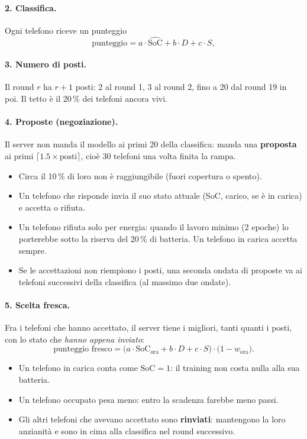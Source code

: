 \documentclass[11pt,a4paper]{article}
\begin{document}
\paragraph{2. Classifica.}
Ogni telefono riceve un punteggio
\begin{equation*}
  \text{punteggio} = a \cdot \widehat{\mathrm{SoC}} + b \cdot D + c \cdot S ,
\end{equation*}

\paragraph{3. Numero di posti.}
Il round $r$ ha $r + 1$ posti: 2 al round 1, 3 al round 2, fino a 20 dal
round 19 in poi. Il tetto è il 20\,\% dei telefoni ancora vivi.

\paragraph{4. Proposte (negoziazione).}
Il server non manda il modello ai primi 20 della classifica: manda una
\textbf{proposta} ai primi $\lceil 1.5 \times \text{posti} \rceil$, cioè
30 telefoni una volta finita la rampa.
\begin{itemize}
  \item Circa il 10\,\% di loro non è raggiungibile (fuori copertura o spento).
  \item Un telefono che risponde invia il suo stato attuale (SoC, carico, se
        è in carica) e accetta o rifiuta.
  \item Un telefono rifiuta solo per energia: quando il lavoro minimo (2 epoche)
        lo porterebbe sotto la riserva del 20\,\% di batteria. Un telefono in
        carica accetta sempre.
  \item Se le accettazioni non riempiono i posti, una seconda ondata di proposte
        va ai telefoni successivi della classifica (al massimo due ondate).
\end{itemize}

\paragraph{5. Scelta fresca.}
Fra i telefoni che hanno accettato, il server tiene i migliori, tanti quanti
i posti, con lo stato che \emph{hanno appena inviato}:
\begin{equation*}
  \text{punteggio fresco} = \bigl(a \cdot \mathrm{SoC}_{\text{ora}} + b \cdot D
                        + c \cdot S\bigr) \cdot \bigl(1 - w_{\text{ora}}\bigr).
\end{equation*}
\begin{itemize}
  \item Un telefono in carica conta come $\mathrm{SoC} = 1$: il training non
        costa nulla alla sua batteria.
  \item Un telefono occupato pesa meno: entro la scadenza farebbe meno passi.
  \item Gli altri telefoni che avevano accettato sono \textbf{rinviati}:
        mantengono la loro anzianità e sono in cima alla classifica nel round
        successivo.
\end{itemize}
\end{document}
